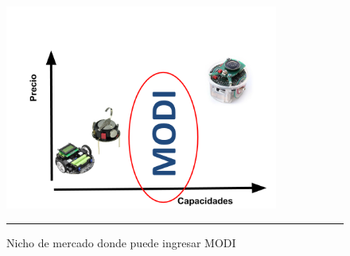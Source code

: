 \begin{figure}[htbp]
	\centering
		\includegraphics[width=0.8\textwidth]{./Figures/nicho.png}
		\rule{35em}{0.5pt}
	\caption[Nicho de mercado]{Nicho de mercado donde puede ingresar MODI}
	\label{fig:nicho}
\end{figure}


